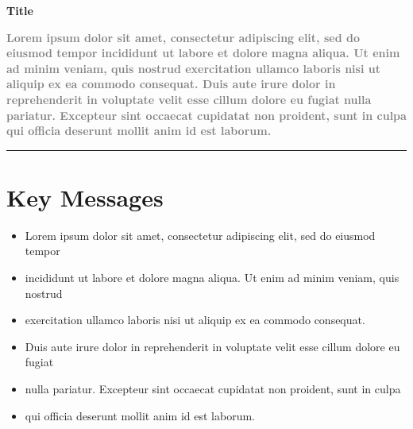 \documentclass[12pt,twoside,a4paper]{article}
\begin{document}
\sloppy

\bigskip

\textbf{{\Large \color{section} Title}} 

\textcolor{gray}{\textbf{%
Lorem ipsum dolor sit amet, consectetur adipiscing elit, sed do eiusmod tempor incididunt ut labore et dolore magna aliqua. Ut enim ad minim veniam, quis nostrud exercitation ullamco laboris nisi ut aliquip ex ea commodo consequat. Duis aute irure dolor in reprehenderit in voluptate velit esse cillum dolore eu fugiat nulla pariatur. Excepteur sint occaecat cupidatat non proident, sunt in culpa qui officia deserunt mollit anim id est laborum.}}\newline
{\color{section!40}\bigskip\rule{\linewidth}{1.5pt}}

\vspace{-.5cm}
\section*{Key Messages}
\begin{tcolorbox}[width=\textwidth,colback={section!10},colframe=section!40]
\begin{itemize}[leftmargin=0.4cm]
    \item Lorem ipsum dolor sit amet, consectetur adipiscing elit, sed do eiusmod tempor 
    \item incididunt ut labore et dolore magna aliqua. Ut enim ad minim veniam, quis nostrud 
    \item exercitation ullamco laboris nisi ut aliquip ex ea commodo consequat. 
    \item Duis aute irure dolor in reprehenderit in voluptate velit esse cillum dolore eu fugiat 
    \item nulla pariatur. Excepteur sint occaecat cupidatat non proident, sunt in culpa 
    \item qui officia deserunt mollit anim id est laborum.
\end{itemize}
\end{tcolorbox}
\end{document}
